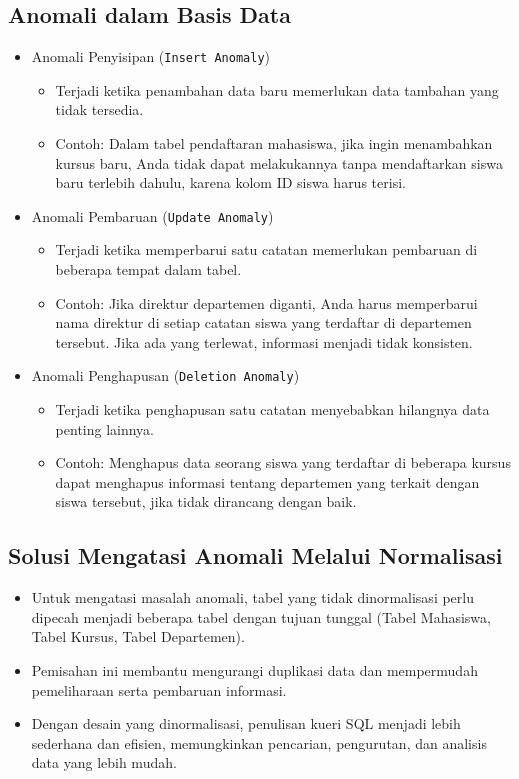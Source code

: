 \documentclass{article}
\begin{document}
\subsection{Anomali dalam Basis Data}
\begin{itemize}
    \item Anomali Penyisipan (\texttt{Insert Anomaly})
          \begin{itemize}
              \item Terjadi ketika penambahan data baru memerlukan data tambahan yang tidak tersedia.
              \item Contoh: Dalam tabel pendaftaran mahasiswa, jika ingin menambahkan kursus baru, Anda tidak dapat melakukannya tanpa mendaftarkan siswa baru terlebih dahulu, karena kolom ID siswa harus terisi.
          \end{itemize}
    \item Anomali Pembaruan (\texttt{Update Anomaly})
          \begin{itemize}
              \item Terjadi ketika memperbarui satu catatan memerlukan pembaruan di beberapa tempat dalam tabel.
              \item Contoh: Jika direktur departemen diganti, Anda harus memperbarui nama direktur di setiap catatan siswa yang terdaftar di departemen tersebut. Jika ada yang terlewat, informasi menjadi tidak konsisten.
          \end{itemize}
    \item Anomali Penghapusan (\texttt{Deletion Anomaly})
          \begin{itemize}
              \item Terjadi ketika penghapusan satu catatan menyebabkan hilangnya data penting lainnya.
              \item Contoh: Menghapus data seorang siswa yang terdaftar di beberapa kursus dapat menghapus informasi tentang departemen yang terkait dengan siswa tersebut, jika tidak dirancang dengan baik.
          \end{itemize}
\end{itemize}

\subsection{Solusi Mengatasi Anomali Melalui Normalisasi}
\begin{itemize}
    \item Untuk mengatasi masalah anomali, tabel yang tidak dinormalisasi perlu dipecah menjadi beberapa tabel dengan tujuan tunggal (Tabel Mahasiswa, Tabel Kursus, Tabel Departemen).
    \item Pemisahan ini membantu mengurangi duplikasi data dan mempermudah pemeliharaan serta pembaruan informasi.
    \item Dengan desain yang dinormalisasi, penulisan kueri SQL menjadi lebih sederhana dan efisien, memungkinkan pencarian, pengurutan, dan analisis data yang lebih mudah.
\end{itemize}
\end{document}
